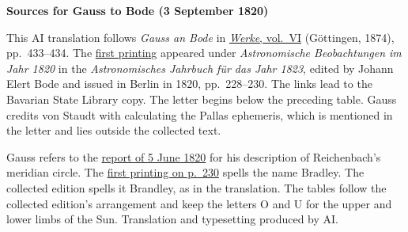 \clearpage\thispagestyle{empty}
\begin{center}\textbf{Sources for Gauss to Bode (3 September 1820)}\end{center}
\noindent This AI translation follows \textit{Gauss an Bode} in \href{https://gdz.sub.uni-goettingen.de/id/PPN236007467}{\textit{Werke}, vol.~VI} (Göttingen, 1874), pp.~433--434. The \href{https://api.digitale-sammlungen.de/iiif/image/v2/bsb10538352_00234/full/1600,/0/default.jpg}{first printing} appeared under \textit{Astronomische Beobachtungen im Jahr 1820} in the \textit{Astronomisches Jahrbuch für das Jahr 1823}, edited by Johann Elert Bode and issued in Berlin in 1820, pp.~228--230. The links lead to the Bavarian State Library copy. The letter begins below the preceding table. Gauss credits von Staudt with calculating the Pallas ephemeris, which is mentioned in the letter and lies outside the collected text.
\par\smallskip\noindent Gauss refers to the \hyperlink{native-434-part-lower}{report of 5 June 1820} for his description of Reichenbach’s meridian circle. The \href{https://api.digitale-sammlungen.de/iiif/image/v2/bsb10538352_00236/full/1600,/0/default.jpg}{first printing on p.~230} spells the name Bradley. The collected edition spells it Brandley, as in the translation. The tables follow the collected edition’s arrangement and keep the letters O and U for the upper and lower limbs of the Sun. Translation and typesetting produced by AI.
\clearpage
